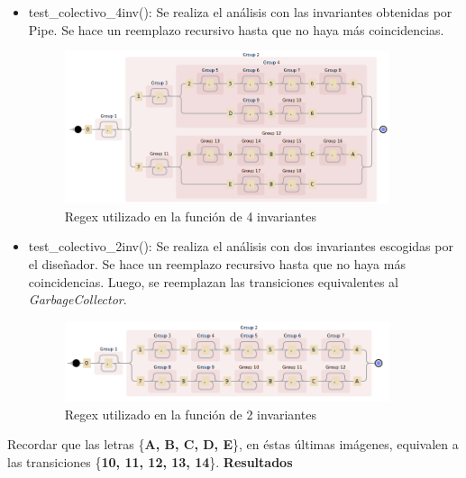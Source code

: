 \documentclass{article}
\begin{document}
    \begin{itemize}
        \item test\_colectivo\_4inv(): Se realiza el análisis con las invariantes obtenidas 
        por Pipe. Se hace un reemplazo recursivo hasta que no haya más coincidencias.
        \begin{figure}[H]
            \includegraphics[width=0.9\textwidth, center]{regex4inv.png}
            \caption{Regex utilizado en la función de 4 invariantes}
        \end{figure}
        \item test\_colectivo\_2inv(): Se realiza el análisis con dos invariantes escogidas 
        por el diseñador. Se hace un reemplazo recursivo hasta que no haya más coincidencias.
        Luego, se reemplazan las transiciones equivalentes al \emph{GarbageCollector}.
        \begin{figure}[H]
            \includegraphics[width=0.9\textwidth, center]{regex2inv.png}
            \caption{Regex utilizado en la función de 2 invariantes}
        \end{figure}
    \end{itemize} \par
    Recordar que las letras \{\textbf{A, B, C, D, E}\}, en éstas últimas imágenes, 
    equivalen a las transiciones \{\textbf{10, 11, 12, 13, 14}\}. \newline \newline
    \textbf{Resultados}
\end{document}
